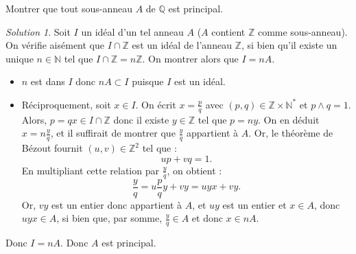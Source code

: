 \documentclass[french]{book}
\newcommand{\N}{\mathbb{N}}
\newcommand{\Z}{\mathbb{Z}}
\newcommand{\Q}{\mathbb{Q}}
\newcommand{\st}{^*}
\theoremstyle{definition}
\theoremstyle{remark}
\newtheorem*{sol}{Solution}
\begin{document}
\begin{exo}[2]{}
	Montrer que tout sous-anneau $A$ de $\Q$ est principal.
\end{exo}
\begin{sol}
	Soit $I$ un idéal d'un tel anneau $A$ ($A$ contient $\Z$ comme sous-anneau). On vérifie aisément que $I\cap\Z$ est un idéal de l'anneau $\Z$, si bien qu'il existe un unique $n\in\N$ tel que $I\cap \Z=n\Z$. On montrer alors que $I=nA$.
	\begin{itemize}
		\item $n$ est dans $I$ donc $nA\subset I$ puisque $I$ est un idéal.
		\item Réciproquement, soit $x\in I$. On écrit $x=\displaystyle\frac{p}{q}$ avec $(p,q)\in\Z\times\N\st$ et $p\wedge q=1$. Alors, $p=qx\in I\cap\Z$ donc il existe $y\in\Z$ tel que $p=ny$. On en déduit $x=n\displaystyle\frac{y}{q}$, et il suffirait de montrer que $\displaystyle\frac{y}{q}$ appartient à $A$. Or, le théorème de Bézout fournit $(u,v)\in\Z^2$ tel que :
		$$up+vq=1.$$
		En multipliant cette relation par $\displaystyle\frac{y}{q}$, on obtient :
		$$\frac{y}{q}=u\frac{p}{q}y+vy=uyx+vy.$$ Or, $vy$ est un entier donc appartient à $A$, et $uy$ est un entier et $x\in A$, donc $uyx\in A$, si bien que, par somme, $\displaystyle\frac{y}{q}\in A$ et donc $x\in nA$.
	\end{itemize}
	Donc $I=nA$. Donc $A$ est principal.
\end{sol}
\end{document}
